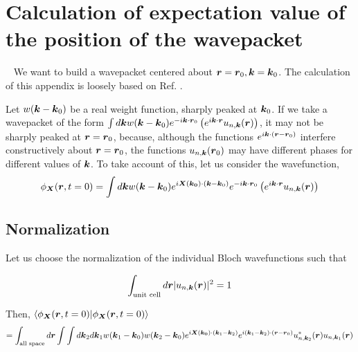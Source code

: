 \documentclass{report}
\renewcommand\vec[1]{\ensuremath\boldsymbol{#1}} %
\begin{document}
\chapter{Calculation of expectation value of the position of the wavepacket}~\label{app:center-at-zero-time}
We want to build a wavepacket centered about $\vec{r}= \vec{r}_0, \vec{k}= \vec{k}_0$. The calculation of this appendix is loosely based on Ref. \cite{ralph2020berry}.


Let  $w(\vec{k} - \vec{k}_0)$ be a real weight function, sharply peaked at $\vec{k}_0$. If we take a wavepacket of the form $\int d\vec{k} w(\vec{k} - \vec{k}_0) e^{-i \vec{k} \cdot \vec{r}_0 } \left(e^{i \vec{k} \cdot\vec{r}} u_{n,\vec{k}}(\vec{r})\right)$, it may not be sharply peaked at $\vec{r} = \vec{r}_0$, because, although the functions $e^{i \vec{k} \cdot(\vec{r} - \vec{r}_0)}$ interfere constructively about $\vec{r} = \vec{r}_0$, the functions $u_{n,\vec{k}}(\vec{r}_0)$ may have different phases for different values of $\vec{k}$. To take account of this, let us consider the wavefunction, 
\begin{equation}\label{Eq:wavefunction-X}
	\phi_{\vec{X}}(\vec{r}, t=0) = \int d\vec{k} w(\vec{k} - \vec{k}_0) e^{i \vec{X}(\vec{k_0})\cdot (\vec{k} - \vec{k}_0)} e^{-i \vec{k} \cdot \vec{r}_0 } \left(e^{i \vec{k} \cdot\vec{r}} u_{n,\vec{k}}(\vec{r})\right)
\end{equation}

\section{Normalization}\label{app:sec:Bloch-normalization}
 Let us choose the normalization of the individual Bloch wavefunctions such that

\begin{equation}\label{Eq:BlochNormalization}
	\int_{\text{unit cell}} d\vec{r} |u_{n,\vec{k}}(\vec{r})|^2 = 1
\end{equation}

Then, $\bra{\phi_{\vec{X}}(\vec{r}, t=0)}\ket{\phi_{\vec{X}}(\vec{r}, t=0)}$
$$ = \int_{\text{all space}} d\vec{r} \int \int d\vec{k}_2 d\vec{k}_1  w(\vec{k}_1 - \vec{k}_0) w(\vec{k}_2 - \vec{k}_0) e^{i \vec{X}(\vec{k_0})\cdot (\vec{k}_1 - \vec{k}_2)} e^{i (\vec{k}_1 - \vec{k}_2) \cdot (\vec{r} - \vec{r}_0) }  u^*_{n,\vec{k}_2}(\vec{r}) u_{n,\vec{k}_1}(\vec{r})$$
\end{document}
